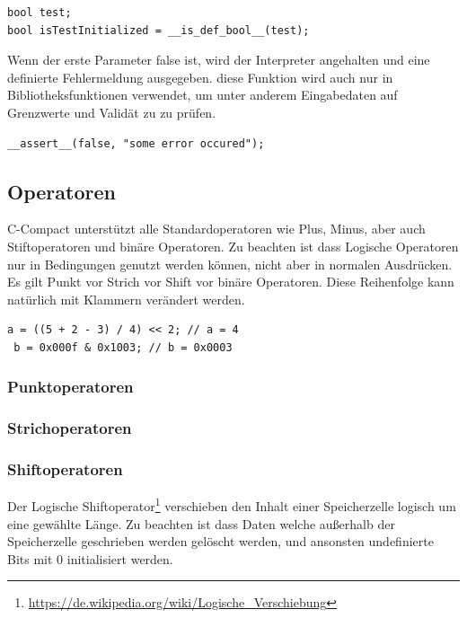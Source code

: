 \begin{lstlisting}[language=CMM]
bool test;
bool isTestInitialized = __is_def_bool__(test);
\end{lstlisting}


Wenn der erste Parameter false ist, wird der Interpreter angehalten und eine definierte Fehlermeldung ausgegeben. diese Funktion wird auch nur in Bibliotheksfunktionen verwendet, um unter anderem Eingabedaten auf Grenzwerte und Valid\"at zu zu pr\"ufen.

\begin{lstlisting}[language=CMM]
__assert__(false, "some error occured");
\end{lstlisting}

\subsection{Operatoren}

C-Compact unterst\"utzt alle Standardoperatoren wie Plus, Minus, aber auch Stiftoperatoren und binäre Operatoren. Zu beachten ist dass Logische Operatoren nur in Bedingungen genutzt werden k\"onnen, nicht aber in normalen Ausdr\"ucken. Es gilt Punkt vor Strich vor Shift vor bin\"are Operatoren. Diese Reihenfolge kann nat\"urlich mit Klammern ver\"andert werden.

\begin{lstlisting}[language=CMM]
 a = ((5 + 2 - 3) / 4) << 2; // a = 4
 b = 0x000f & 0x1003; // b = 0x0003
\end{lstlisting}

\subsubsection{Punktoperatoren}

\subsubsection{Strichoperatoren}

\subsubsection{Shiftoperatoren}

Der Logische Shiftoperator\footnote{\url{https://de.wikipedia.org/wiki/Logische_Verschiebung}} verschieben den Inhalt einer Speicherzelle logisch um eine gew\"ahlte L\"ange. Zu beachten ist dass Daten welche außerhalb der Speicherzelle geschrieben werden gel\"oscht werden, und ansonsten undefinierte Bits mit 0 initialisiert werden.

